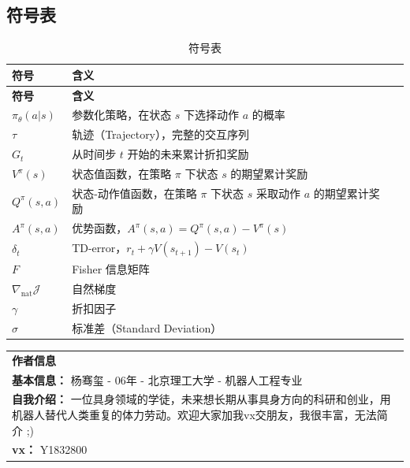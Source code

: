 \documentclass[12pt,a4paper]{article}
\newcommand{\grad}{\nabla}
\theoremstyle{noteplain}
\theoremstyle{noteexercise}
\begin{document}
\subsection{符号表}\label{ssec:symbols}

\begin{longtable}{m{4cm}ll}
  \caption{符号表} \label{tab:symbols} \\
  \toprule
  \textbf{符号} & \textbf{含义} \\
  \midrule
  \endfirsthead
  \toprule
  \textbf{符号} & \textbf{含义} \\
  \midrule
  \endhead
  \bottomrule
  \endlastfoot

  $\pi_\theta(a|s)$ & 参数化策略，在状态 $s$ 下选择动作 $a$ 的概率 \\
  $\tau$ & 轨迹（Trajectory），完整的交互序列 \\
  $G_t$ & 从时间步 $t$ 开始的未来累计折扣奖励 \\
  $V^\pi(s)$ & 状态值函数，在策略 $\pi$ 下状态 $s$ 的期望累计奖励 \\
  $Q^\pi(s,a)$ & 状态-动作值函数，在策略 $\pi$ 下状态 $s$ 采取动作 $a$ 的期望累计奖励 \\
  $A^\pi(s,a)$ & 优势函数，$A^\pi(s,a) = Q^\pi(s,a) - V^\pi(s)$ \\
  $\delta_t$ & TD-error，$r_t + \gamma V(s_{t+1}) - V(s_t)$ \\
  $F$ & Fisher 信息矩阵 \\
  $\grad_\text{nat}\mathcal{J}$ & 自然梯度 \\
  $\gamma$ & 折扣因子 \\
  $\sigma$ & 标准差（Standard Deviation） \\
\end{longtable}

\begin{center}
  \begin{tabular}{p{15cm}}
    \hline
    \textbf{\large 作者信息} \\
    \textbf{基本信息：} 杨骞玺 - 06年 - 北京理工大学 - 机器人工程专业 \\
    \textbf{自我介绍：} 一位具身领域的学徒，未来想长期从事具身方向的科研和创业，用机器人替代人类重复的体力劳动。欢迎大家加我vx交朋友，我很丰富，无法简介 ;) \\
    \textbf{vx：} Y1832800 \\
    \hline
  \end{tabular}
\end{center}
\end{document}
